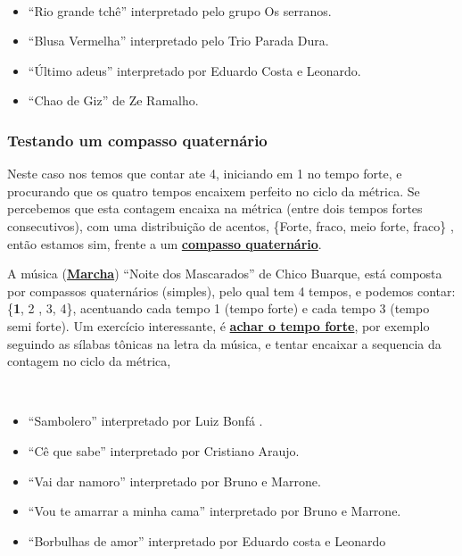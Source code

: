 \begin{example}
\label{ex:compassosimples3t2}
~
\begin{itemize}
\item ``Rio grande tchê'' interpretado pelo grupo Os serranos.
\item ``Blusa Vermelha'' interpretado pelo Trio Parada Dura.
\item ``Último adeus'' interpretado por Eduardo Costa e Leonardo.
\item ``Chao de Giz'' de Ze Ramalho.
\end{itemize}
\end{example}

\subsubsection{Testando um compasso quaternário}
Neste caso nos temos que contar ate 4, iniciando em 1 no tempo forte,
e procurando que os quatro tempos encaixem perfeito no ciclo da métrica.
Se percebemos que esta contagem encaixa na métrica (entre dois tempos fortes consecutivos),
com uma distribuição de acentos, \{Forte, fraco, meio forte, fraco\} \cite[pp. 10]{wright1992social}, 
então estamos sim, frente a um  \hyperref[subsec:compassoquaternario]{\textbf{compasso quaternário}}.


\begin{example}
\label{ex:compassosimples4t}
A música (\hyperref[subsec:marcha]{\textbf{Marcha}}) ``Noite dos Mascarados'' de Chico Buarque,
está composta por compassos quaternários (simples), pelo qual tem 4 tempos,
e podemos contar: \{\textbf{1}, 2 , 3, 4\}, acentuando cada tempo 1 (tempo forte) e cada tempo 3 (tempo semi forte).
Um exercício interessante, é \hyperref[subsec:perceberTF1]{\textbf{achar o tempo forte}},
por exemplo seguindo as sílabas tônicas na letra da música,
e tentar encaixar a sequencia da contagem no ciclo da métrica, 
\end{example}

\begin{example}
~
\begin{itemize}
\item ``Sambolero'' interpretado por Luiz Bonfá \cite[pp. 49]{sambolero}.
\item ``Cê que sabe'' interpretado por Cristiano Araujo.
\item ``Vai dar namoro'' interpretado por Bruno e Marrone.
\item ``Vou te amarrar a minha cama'' interpretado por Bruno e Marrone.
\item ``Borbulhas de amor'' interpretado por Eduardo costa e Leonardo%
\end{itemize}
\end{example}

